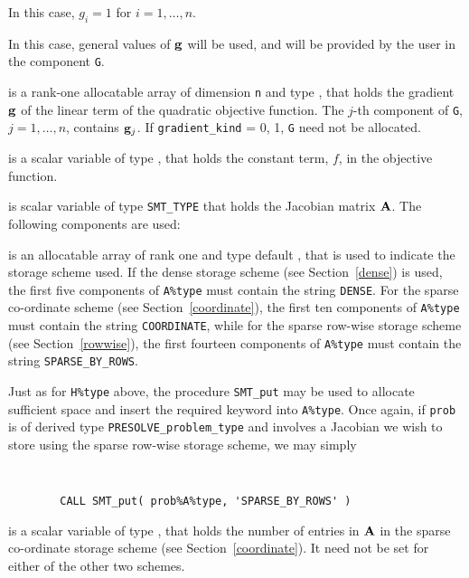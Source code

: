 \documentclass{galahad}
\newcommand{\packagename}{PRESOLVE}
\begin{document}
\begin{description}
\begin{description}
 In this case, $g_{i} = 1$ for $i = 1, \ldots ,n$.

 In this case, general values of ${\mathbf{g}}$ will be used,
     and will be provided by the user in the component {\tt G}.
\end{description}

 is a rank-one allocatable array of dimension {\tt n} and type
\realdp, that holds the gradient ${\mathbf{g}}$
of the linear term of the quadratic objective function.
The $j$-th component of {\tt G}, $j = 1,  \ldots ,  n$, contains ${\mathbf{g}}_{j}$.
If {\tt gradient\_kind} {= 0, 1}, {\tt G} need not be allocated.

 is a scalar variable of type
\realdp, that holds
the constant term, $f$, in the objective function.

 is scalar variable of type {\tt SMT\_TYPE}
that holds the Jacobian matrix ${\mathbf{A}}$. The following components are used:

\begin{description}

 is an allocatable array of rank one and type default \character, that
is used to indicate the storage scheme used. If the dense storage scheme
(see Section~\ref{dense}) is used,
the first five components of {\tt A\%type} must contain the
string {\tt DENSE}.
For the sparse co-ordinate scheme (see Section~\ref{coordinate}),
the first ten components of {\tt A\%type} must contain the
string {\tt COORDINATE}, while
for the sparse row-wise storage scheme (see Section~\ref{rowwise}),
the first fourteen components of {\tt A\%type} must contain the
string {\tt SPARSE\_BY\_ROWS}.

Just as for {\tt H\%type} above, the procedure {\tt SMT\_put}
may be used to allocate sufficient space and insert the required keyword
into {\tt A\%type}.
Once again, if {\tt prob} is of derived type {\tt \packagename\_problem\_type}
and involves a Jacobian we wish to store using the sparse row-wise
storage scheme, we may simply
{\tt
\begin{verbatim}
        CALL SMT_put( prob%A%type, 'SPARSE_BY_ROWS' )
\end{verbatim}
}
\noindent

 is a scalar variable of type \integer, that
holds the number of entries in ${\mathbf{A}}$
in the sparse co-ordinate storage scheme (see Section~\ref{coordinate}).
It need not be set for either of the other two schemes.


\end{description}
\end{description}
\end{document}
